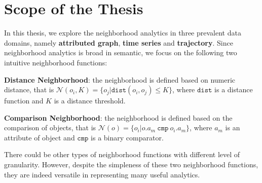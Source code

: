 \section{Scope of the Thesis}
In this thesis, we explore the neighborhood analytics in
three prevalent data domains, namely \textbf{attributed graph},
\textbf{time series} and \textbf{trajectory}. 
Since neighborhood analytics is broad in
semantic, we focus on the following
two intuitive neighborhood functions:

\textbf{Distance Neighborhood}: the neighborhood is defined based on numeric distance, that is $\mathcal{N}(o_i,K) = \{o_j | \mathtt{dist}(o_i,o_j) \leq K \}$, where $\mathtt{dist}$ is a distance function and $K$ is a distance threshold.

\textbf{Comparison Neighborhood}: the neighborhood is defined based on the comparison of objects, that is $\mathcal{N}(o) = \{o_i | o.a_m \ \mathtt{cmp} \ o_i.a_m\}$, where $a_m$ is an attribute of object
and $\mathtt{cmp}$ is a binary comparator.

There could be other types of neighborhood functions with different level of granularity. 
However, despite the simpleness of these two neighborhood functions, they 
are indeed versatile in representing many useful analytics.

%
%
%


